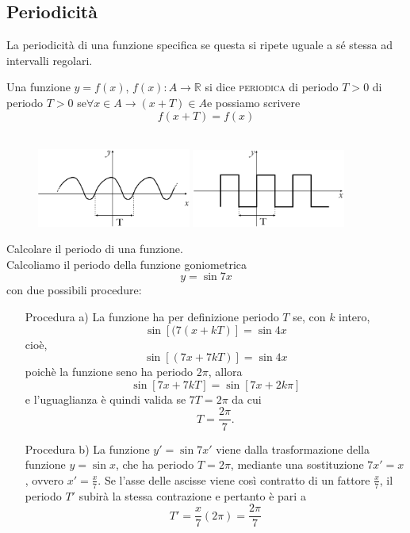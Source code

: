 \subsection{Periodicità}
La periodicità di una funzione specifica se questa si ripete uguale a sé 
stessa ad intervalli regolari.\\

\begin{definizione}
Una funzione $y=f(x)$, $f(x): A\to \mathbb{R}$ si dice \textsc{periodica} di 
periodo $T>0$ di periodo $T>0$ se$\forall x\in A\rightarrow (x+T)\in A$e 
possiamo scrivere 
 $$f(x+T)=f(x)$$\\
\end{definizione}

\begin{figure}[htpb!]
  \centering
  \includegraphics[width=0.45\textwidth]{img/funz_11a.png} \quad 
  \includegraphics[width=0.45\textwidth]{img/funz_11b.png}
\end{figure}


\begin{esempio} Calcolare il periodo di una funzione.\\
Calcoliamo il periodo della  funzione goniometrica $$y=\sin{7x}$$ con due 
possibili procedure:
\begin{itemize}
  \item[\textsf{Procedura a)}] La funzione ha per definizione periodo 
$T$ se, con $k$ intero,
$$\sin[(7(x+kT)]=\sin4x$$
cioè,
$$\sin[(7x+7kT)]=\sin4x$$
poichè la funzione seno ha periodo $2\pi$, allora
$$\sin[7x+7kT]=\sin[7x+2k\pi]$$
e l'uguaglianza è quindi valida se $7T=2\pi$ da cui
$$T=\frac{2\pi}{7}.$$

  \item[\textsf{Procedura b)}] La funzione $y'=\sin7x'$ viene dalla 
trasformazione della funzione $y=\sin x$, che ha periodo $T=2\pi$, mediante 
una sostituzione $7x'=x$, ovvero $x'=\frac{x}{7}$. Se l'asse delle ascisse 
viene così contratto di un fattore $\frac{x}{7}$, il periodo $T'$ subirà la 
stessa contrazione e pertanto è pari a $$T'=\frac{x}{7}(2\pi)=\frac{2\pi}{7}$$
\end{itemize}
\end{esempio}

